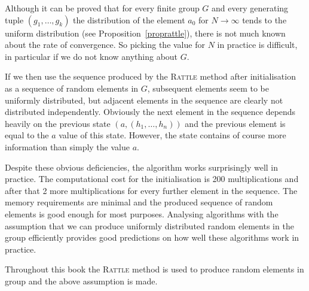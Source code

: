 Although it can be proved that for every finite group $G$ and every
generating tuple $(g_1, \ldots, g_k)$ the distribution of the element
$a_0$ for $N \to \infty$ tends to the uniform distribution (see
Proposition~\ref{proprattle}), there is
not much known about the rate of convergence. So picking the value for
$N$ in practice is difficult, in particular if we do not know anything
about $G$.

If we then use the sequence produced by the \textsc{Rattle} method
after initialisation as a sequence of random elements in $G$, 
subsequent elements seem to be uniformly distributed, but adjacent
elements in the sequence are clearly not distributed independently.
Obviously the next element in the sequence depends heavily on the
previous state $(a,(h_1,\ldots,h_n))$ and the previous element is
equal to the $a$ value of this state. However, the state contains of
course more information than simply the value $a$.

Despite these obvious deficiencies, the algorithm
works surprisingly well in practice. The computational cost for the 
initialisation is 200 multiplications and after that 2 more
multiplications for every further element in the sequence.
The memory requirements are minimal and the produced sequence of
random elements is good enough for most purposes. Analysing algorithms
with the assumption that we can produce uniformly distributed random
elements in the group efficiently provides good predictions on how
well these algorithms work in practice.

Throughout this book the \textsc{Rattle} method is used to produce
random elements in group and the above assumption is made.

